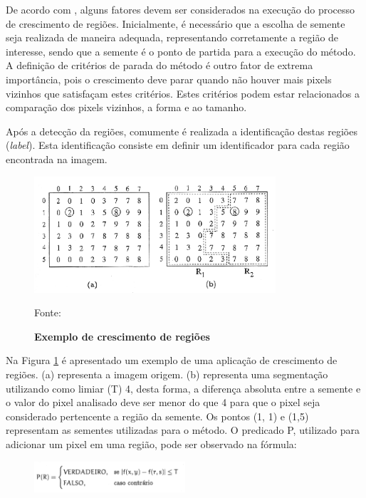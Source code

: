 \documentclass[
	12pt,				%
	oneside,			%
	a4paper,			%
	english,			%
	french,				%
	spanish,			%
	brazil,				%
	]{abntex2}
\begin{document}
De acordo com \citet{conciAzevedoLeta:2008}, alguns fatores devem ser considerados na execução do processo de crescimento de regiões. Inicialmente, é necessário que a escolha de semente seja realizada de maneira adequada, representando corretamente a região de interesse, sendo que a semente é o ponto de partida para a execução do método. A definição de critérios de parada do método é outro fator de extrema importância, pois o crescimento deve parar quando não houver mais pixels vizinhos que satisfaçam estes critérios. Estes critérios podem estar relacionados a comparação dos pixels vizinhos, a forma e ao tamanho.

Após a detecção da regiões, comumente é realizada a identificação destas regiões (\textit{label}). Esta identificação consiste em definir um identificador para cada região encontrada na imagem. 

\begin{figure}[ht]
\centering
\caption{\textbf{Exemplo de crescimento de regiões}}
\includegraphics[width=0.8\textwidth]{imagens/crescimento_regiao.png}

Fonte: \citet{pedriniSchwartz:2008}
\label{fig:crescimento_regiao}
\end{figure}

Na Figura \ref{fig:crescimento_regiao} é apresentado um exemplo de uma aplicação de crescimento de regiões. (a) representa a imagem origem. (b) representa uma segmentação utilizando como limiar (T) 4, desta forma, a diferença absoluta entre a semente e o valor do pixel analisado deve ser menor do que 4 para que o pixel seja considerado pertencente a região da semente. Os pontos (1, 1) e (1,5) representam as sementes utilizadas para o método. O predicado P, utilizado para adicionar um pixel em uma região, pode ser observado na fórmula:

\begin{figure}[ht]
\centering
\includegraphics[width=0.5\textwidth]{imagens/crescimentoregiao_formula.png}
\end{figure}
\end{document}
